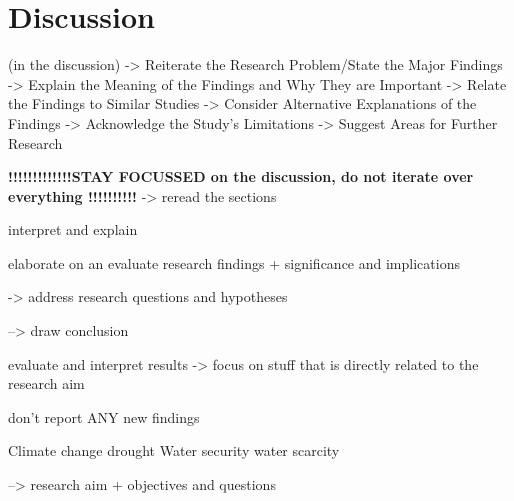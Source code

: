 
\chapter{Discussion} %

\label{Chapter5} %

(in the discussion)
-> Reiterate the Research Problem/State the Major Findings
-> Explain the Meaning of the Findings and Why They are Important
-> Relate the Findings to Similar Studies
-> Consider Alternative Explanations of the Findings
-> Acknowledge the Study's Limitations
-> Suggest Areas for Further Research


\textbf{!!!!!!!!!!!!!STAY FOCUSSED on the discussion, do not iterate over everything !!!!!!!!!!}
-> reread the sections


interpret and explain

elaborate on an evaluate research findings + significance and implications

-> address research questions and hypotheses

--> draw conclusion

evaluate and interpret results
-> focus on stuff that is directly related to the research aim

don't report ANY new findings


Climate change
drought
Water security
water scarcity

--> research aim
+ objectives and questions











